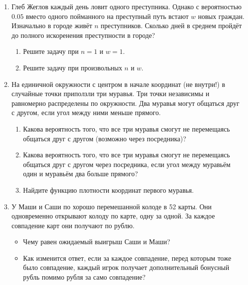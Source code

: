 \documentclass[12pt]{article}
\begin{document}
\begin{enumerate}
     \item %
     Глеб Жеглов каждый день ловит одного преступника. 
     Однако с вероятностью $0.05$ вместо одного пойманного на преступный путь встают $w$ новых граждан. 
     Изначально в городе живёт $n$ преступников.
     Сколько дней в среднем пройдёт до полного искоренения преступности в городе?
     \begin{enumerate}
         \item Решите задачу при $n = 1$ и $w = 1$.
         \item Решите задачу при произвольных $n$ и $w$.
     \end{enumerate}
     \item %
     На единичной окружности с центром в начале координат (не внутри!) в случайные точки приползли три муравья.
     Три точки  независимы и равномерно распределены по окружности. 
     Два муравья могут общаться друг с другом, если угол между ними меньше прямого. 
 
 \begin{enumerate}
     \item Какова вероятность того, что все три муравья смогут не перемещаясь общаться друг с другом (возможно
     через посредника)?
     \item Какова вероятность того, что все три муравья смогут не перемещаясь общаться друг с другом через посредника, 
     если угол между муравьём один и муравьём два больше прямого?
     \item Найдите функцию плотности координат первого муравья. 
 \end{enumerate}

 \item У Маши и Саши по хорошо перемешанной колоде в 52 карты. 
 Они одновременно открывают колоду по карте, одну за одной.
 За каждое совпадение карт они получают по рублю. 
 \begin{itemize}
    \item Чему равен ожидаемый выигрыш Саши и Маши?
    \item Как изменится ответ, если за каждое совпадение, перед которым тоже было совпадение, каждый игрок получает дополнительный бонусный рубль помимо рубля за само совпадение?
\end{itemize}
 
\end{enumerate}
\end{document}
